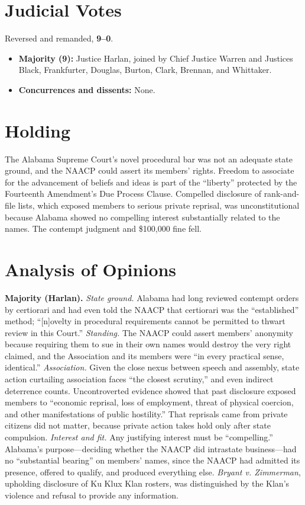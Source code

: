\documentclass[12pt]{article}
\begin{document}
\section{Judicial Votes}

Reversed and remanded, \textbf{9--0}.
\begin{itemize}
\item \textbf{Majority (9):} Justice Harlan, joined by Chief Justice Warren and Justices Black, Frankfurter, Douglas, Burton, Clark, Brennan, and Whittaker.
\item \textbf{Concurrences and dissents:} None.
\end{itemize}

\section{Holding}

The Alabama Supreme Court's novel procedural bar was not an adequate state ground, and the NAACP could assert its members' rights. Freedom to associate for the advancement of beliefs and ideas is part of the ``liberty'' protected by the Fourteenth Amendment's Due Process Clause. Compelled disclosure of rank-and-file lists, which exposed members to serious private reprisal, was unconstitutional because Alabama showed no compelling interest substantially related to the names. The contempt judgment and \$100,000 fine fell.

\section{Analysis of Opinions}

\textbf{Majority (Harlan).} \emph{State ground.} Alabama had long reviewed contempt orders by certiorari and had even told the NAACP that certiorari was the ``established'' method; ``[n]ovelty in procedural requirements cannot be permitted to thwart review in this Court.'' \emph{Standing.} The NAACP could assert members' anonymity because requiring them to sue in their own names would destroy the very right claimed, and the Association and its members were ``in every practical sense, identical.'' \emph{Association.} Given the close nexus between speech and assembly, state action curtailing association faces ``the closest scrutiny,'' and even indirect deterrence counts. Uncontroverted evidence showed that past disclosure exposed members to ``economic reprisal, loss of employment, threat of physical coercion, and other manifestations of public hostility.'' That reprisals came from private citizens did not matter, because private action takes hold only after state compulsion. \emph{Interest and fit.} Any justifying interest must be ``compelling.'' Alabama's purpose---deciding whether the NAACP did intrastate business---had no ``substantial bearing'' on members' names, since the NAACP had admitted its presence, offered to qualify, and produced everything else. \textit{Bryant v. Zimmerman}, upholding disclosure of Ku Klux Klan rosters, was distinguished by the Klan's violence and refusal to provide any information.
\end{document}
